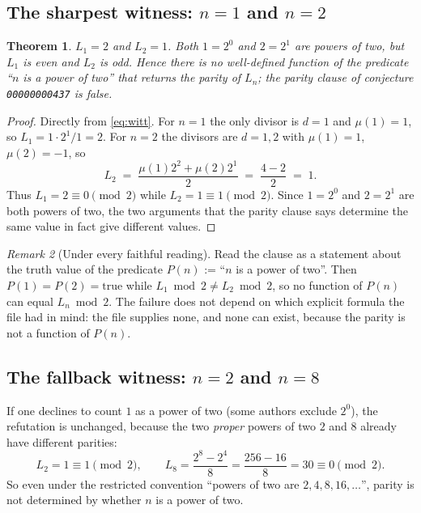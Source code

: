 \documentclass[11pt]{article}
\newtheorem{theorem}{Theorem}
\theoremstyle{definition}
\theoremstyle{remark}
\newtheorem{remark}[theorem]{Remark}
\begin{document}
\subsection{The sharpest witness: $n = 1$ and $n = 2$}

\begin{theorem}\label{thm:main}
$L_1 = 2$ and $L_2 = 1$. Both $1 = 2^0$ and $2 = 2^1$ are powers of two, but
$L_1$ is even and $L_2$ is odd. Hence there is no well-defined function of the
predicate ``$n$ is a power of two'' that returns the parity of $L_n$; the
parity clause of conjecture \texttt{00000000437} is false.
\end{theorem}

\begin{proof}
Directly from \eqref{eq:witt}. For $n = 1$ the only divisor is $d = 1$ and
$\mu(1) = 1$, so $L_1 = 1 \cdot 2^1 / 1 = 2$. For $n = 2$ the divisors are
$d = 1, 2$ with $\mu(1) = 1$, $\mu(2) = -1$, so
\[
  L_2 \;=\; \frac{\mu(1)2^2 + \mu(2)2^1}{2}
        \;=\; \frac{4 - 2}{2} \;=\; 1 .
\]
Thus $L_1 = 2 \equiv 0 \pmod 2$ while $L_2 = 1 \equiv 1 \pmod 2$. Since
$1 = 2^0$ and $2 = 2^1$ are both powers of two, the two arguments that the
parity clause says determine the same value in fact give different values.
\end{proof}

\begin{remark}[Under every faithful reading]
Read the clause as a statement about the truth value of the predicate $P(n)$ :=
``$n$ is a power of two''. Then $P(1) = P(2) = \text{true}$ while
$L_1 \bmod 2 \neq L_2 \bmod 2$, so no function of $P(n)$ can equal
$L_n \bmod 2$. The failure does not depend on which explicit formula the file
had in mind: the file supplies none, and none can exist, because the parity is
not a function of $P(n)$.
\end{remark}

\subsection{The fallback witness: $n = 2$ and $n = 8$}

If one declines to count $1$ as a power of two (some authors exclude $2^0$),
the refutation is unchanged, because the two \emph{proper} powers of two $2$ and
$8$ already have different parities:
\[
  L_2 = 1 \equiv 1 \pmod 2,
  \qquad
  L_8 = \frac{2^8 - 2^4}{8} = \frac{256 - 16}{8} = 30 \equiv 0 \pmod 2 .
\]
So even under the restricted convention ``powers of two are $2,4,8,16,\dots$'',
parity is not determined by whether $n$ is a power of two.
\end{document}
